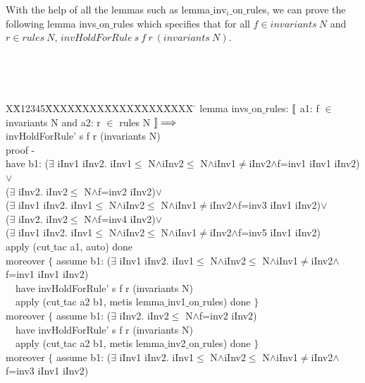 \documentclass{llncs}
\newlength{\fminilength}
\newenvironment{fmini}[1][\linewidth]
  {\setlength{\fminilength}{#1\fboxsep-2\fboxrule}%
   \vspace{2ex}\noindent\begin{lrbox}{\fminibox}\begin{minipage}{\fminilength}%
   \mbox{ }\hfill\vspace{-2.5ex}}%
  {\end{minipage}\end{lrbox}\vspace{1ex}\hspace{0ex}%
   \framebox{\usebox{\fminibox}}}
\newenvironment{specification}
{\noindent\scriptsize
\tt\begin{fmini}\begin{tabbing}X\=X12345\=XXXX\=XXXX\=XXXX\=XXXX\=XXXX
\=\+\kill} {\end{tabbing}\normalfont\end{fmini}}
\def \twoSpaces {\ \ }
\def \iInv {iInv}
\begin{document}
With the help of all the lemmas such as {\sf lemma$\_$inv$_i\_$on$\_$rules},  we can prove the following lemma  {\sf invs$\_$on$\_$rules} which
specifies that for all $f \in invariants~ N$ and $r \in rules~ N$,   $invHoldForRule ~s~ f~ r~ (invariants~ N)$.

\begin{specification}
lemma invs$\_$on$\_$rules:
  $\emph{$\mathopen{\lbrack\mkern-3mu\lbrack}$}$ a1:
f $\in$ invariants N
 and a2:
r $\in$ rules N
  $\emph{$\mathclose{\rbrack\mkern-3mu\rbrack}$}\Longrightarrow$\\
invHoldForRule' s f r (invariants N)\\

  proof -\\
  have b1:
($\exists$ \iInv1 \iInv2. \iInv1$\le$
N$\wedge$\iInv2$\le$
N$\wedge$\iInv1$\neq$\iInv2$\wedge$f=inv1  \iInv1 \iInv2)$\vee$\\
    ($\exists$ \iInv2. \iInv2$\le$
N$\wedge$f=inv2  \iInv2)$\vee$\\
    ($\exists$ \iInv1 \iInv2. \iInv1$\le$
N$\wedge$\iInv2$\le$
N$\wedge$\iInv1$\neq$\iInv2$\wedge$f=inv3  \iInv1 \iInv2)$\vee$\\
    ($\exists$ \iInv2. \iInv2$\le$
N$\wedge$f=inv4  \iInv2)$\vee$\\
    ($\exists$ \iInv1 \iInv2. \iInv1$\le$
N$\wedge$\iInv2$\le$
N$\wedge$\iInv1$\neq$\iInv2$\wedge$f=inv5  \iInv1 \iInv2)\\

  apply (cut$\_$tac a1, auto) done\\
    moreover $\{$      assume b1:
($\exists$ \iInv1 \iInv2. \iInv1$\le$
N$\wedge$\iInv2$\le$
N$\wedge$\iInv1$\neq$\iInv2$\wedge$f=inv1  \iInv1 \iInv2)\\

\twoSpaces       have
invHoldForRule' s f r (invariants N)\\

\twoSpaces      apply (cut$\_$tac a2 b1, metis lemma$\_$inv1$\_$on$\_$rules) done
    $\}$\\


    moreover $\{$ assume b1:
($\exists$ \iInv2. \iInv2$\le$
N$\wedge$f=inv2  \iInv2)\\

\twoSpaces       have invHoldForRule' s f r (invariants N)\\

\twoSpaces      apply (cut$\_$tac a2 b1, metis lemma$\_$inv2$\_$on$\_$rules) done
    $\}$\\


    moreover $\{$      assume b1:
($\exists$ \iInv1 \iInv2. \iInv1$\le$
N$\wedge$\iInv2$\le$
N$\wedge$\iInv1$\neq$\iInv2$\wedge$f=inv3  \iInv1 \iInv2)\\


\end{specification}
\end{document}

